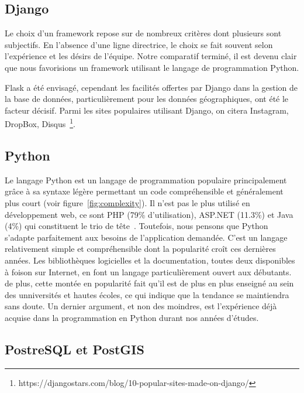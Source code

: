 \documentclass{EPL-master-thesis-covers-FR}
\begin{document}
				\subsection*{Django}
					Le choix d'un framework repose sur de nombreux critères dont plusieurs sont subjectifs. En l'absence d'une ligne directrice, le choix se fait souvent selon l'expérience et les désirs de l'équipe. Notre comparatif terminé, il est devenu clair que nous favorisions un framework utilisant le langage de programmation Python.

					Flask a été envisagé, cependant les facilités offertes par Django dans la gestion de la base de données, particulièrement pour les données géographiques, ont été le facteur décisif. Parmi les sites populaires utilisant Django, on citera Instagram, DropBox, Disqus~\footnote{https://djangostars.com/blog/10-popular-sites-made-on-django/}.

			\subsection*{Python}
				Le langage Python est un langage de programmation populaire principalement grâce à sa syntaxe légère permettant un code compréhensible et généralement plus court (voir figure~\ref{fig:complexity}). Il n'est pas le plus utilisé en développement web, ce sont PHP (79\% d'utilisation), ASP.NET (11.3\%) et Java (4\%) qui constituent le trio de tête~\cite{ref:popular_programming_languages}. Toutefois, nous pensons que Python s'adapte parfaitement aux besoins de l'application demandée. C'est un langage relativement simple et compréhensible dont la popularité croît ces dernières années. Les bibliothèques logicielles et la documentation, toutes deux disponibles à foison sur Internet, en font un langage particulièrement ouvert aux débutants. de plus, cette montée en popularité fait qu'il est de plus en plus enseigné au sein des unniversités et hautes écoles, ce qui indique que la tendance se maintiendra sans doute. Un dernier argument, et non des moindres, est l'expérience déjà acquise dans la programmation en Python durant nos années d'études.

			\subsection*{PostreSQL et PostGIS}
\end{document}
